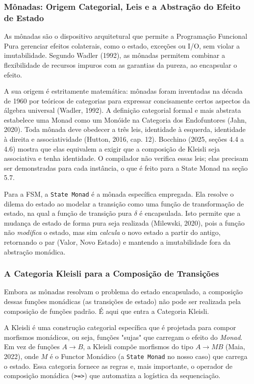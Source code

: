 \documentclass[12pt,a4paper]{article}
\begin{document}
\subsubsection{Mônadas: Origem Categorial, Leis e a Abstração do Efeito de Estado}

As mônadas são o dispositivo arquitetural que permite a Programação Funcional Pura gerenciar efeitos colaterais, como o estado, exceções ou I/O, sem violar a imutabilidade. Segundo Wadler (1992), as mônadas permitem combinar a flexibilidade de recursos impuros com as garantias da pureza, ao encapsular o efeito.

A sua origem é estritamente matemática: mônadas foram inventadas na década de 1960 por teóricos de categorias para expressar concisamente certos aspectos da álgebra universal (Wadler, 1992). A definição categorial formal e mais abstrata estabelece uma Monad como um Monóide na Categoria dos Endofuntores (Jahn, 2020). Toda mônada deve obedecer a três leis, identidade à esquerda, identidade à direita e associatividade (Hutton, 2016, cap. 12). Bocchino (2025, seções 4.4 a 4.6) mostra que elas equivalem a exigir que a composição de Kleisli seja associativa e tenha identidade. O compilador não verifica essas leis; elas precisam ser demonstradas para cada instância, o que é feito para a State Monad na seção 5.7.

Para a FSM, a \texttt{State Monad} é a mônada específica empregada. Ela resolve o dilema do estado ao modelar a transição como uma função de transformação de estado, na qual a função de transição pura $\delta$ é encapsulada. Isto permite que a mudança de estado de forma pura seja realizada (Milewski, 2020), pois a função não \textit{modifica} o estado, mas sim \textit{calcula} o novo estado a partir do antigo, retornando o par (Valor, Novo Estado) e mantendo a imutabilidade fora da abstração monádica.

\subsubsection{A Categoria Kleisli para a Composição de Transições}

Embora as mônadas resolvam o problema do estado encapsulado, a composição dessas funções monádicas (as transições de estado) não pode ser realizada pela composição de funções padrão. É aqui que entra a Categoria Kleisli.

A Kleisli é uma construção categorial específica que é projetada para compor morfismos monádicos, ou seja, funções "sujas" que carregam o efeito do \textit{Monad}. Em vez de funções $A \to B$, a Kleisli compõe morfismos do tipo $A \to MB$ (Maia, 2022), onde $M$ é o Functor Monádico (a \texttt{State Monad} no nosso caso) que carrega o estado. Essa categoria fornece as regras e, mais importante, o operador de composição monádica (\texttt{>=>}) que automatiza a logística da sequenciação.
\end{document}
